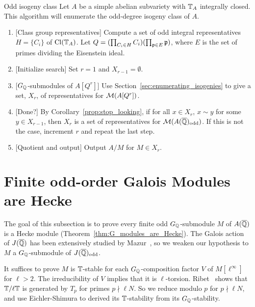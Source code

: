 \documentclass[11pt, proquest]{uwthesis}
\begin{document}
\begin{algorithm}{Odd isogeny class}%
    \label{alg:odd_isogeny_class}
    Let $A$ be a simple abelian subvariety with $\mathbb{T}_A$ integrally closed. This
    algorithm will enumerate the odd-degree isogeny class of $A$.
    \begin{enumerate}
        \item{} [Class group representatives]
            Compute a set of odd integral representatives $H=\{C_i\}$ of
            $\operatorname{Cl}(\mathbb{T}_A)$. Let $Q = (\prod_{C_i\in H} C_i)(\prod_{\mathfrak{p}\in E} \mathfrak{p})$,
            where $E$ is the set of primes dividing the Eisenstein ideal.
        \item{} [Initialize search]
            Set $r=1$ and $X_{r-1}=\emptyset$.
        \item{} [$G_{\mathbb{Q}}$-submodules of $A[Q^r]$]
            Use Section~\ref{sec:enumerating_isogenies} to give a set, $X_r$,
            of representatives for $\mathcal{M}(A[Q^r])$.
        \item{} [Done?]
            By Corollary~\ref{prop:stop_looking}, if for all $x\in X_r$, $x\sim
            y$ for some $y\in X_{r-1}$, then $X_r$ is a set of representatives
            for $\mathcal{M}(A(\overline{\mathbb{Q}})_{\mathrm{odd}})$. If this is not the case, increment $r$
            and repeat the last step.
        \item{} [Quotient and output]
            Output $A/M$ for $M\in X_r$.
    \end{enumerate}
\end{algorithm}

\section{Finite odd-order Galois Modules are Hecke}%
\label{sec:finite_odd_order_galois_modules_are_hecke}

The goal of this subsection is to prove every finite odd $G_{\mathbb{Q}}$-submodule $M$
of $A(\overline{\mathbb{Q}})$ is a Hecke module (Theorem~\ref{thm:G_modules_are_Hecke}). The
Galois action of $J(\overline{\mathbb{Q}})$ has been extensively studied by
Mazur~\cite{mazur:eisenstein}, so we weaken our hypothesis to $M$ a
$G_{\mathbb{Q}}$-submodule of $J(\overline{\mathbb{Q}})_{\mathrm{odd}}$.

It suffices to prove $M$ is $\mathbb{T}$-stable for each $G_{\mathbb{Q}}$-composition factor $V$
of $M[\ell^\infty]$ for $\ell>2$. The irreducibility of $V$ implies that it is
$\ell$-torsion. Ribet~\cite[Proposition 6.1]{ribet:semistable_gal} shows that
$\mathbb{T}/\ell \mathbb{T}$ is generated by $T_p$ for primes $p\nmid \ell N$. So we reduce
modulo $p$ for $p\nmid \ell N$, and use Eichler-Shimura to derived its
$\mathbb{T}$-stability from its $G_{\mathbb{Q}}$-stability.
\end{document}
